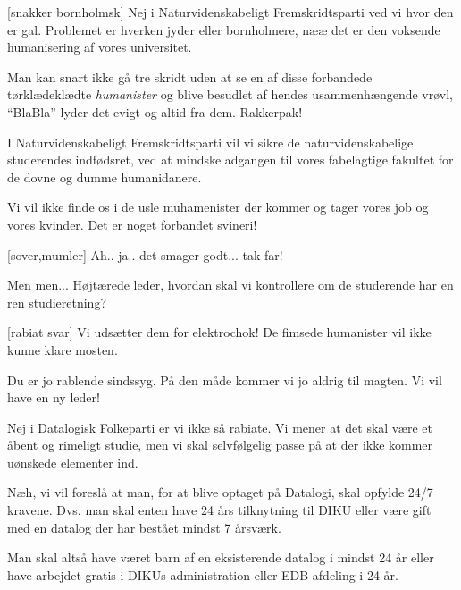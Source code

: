 \documentclass[a4paper,11pt]{article}
\begin{document}
\begin{sketch}
[snakker bornholmsk] Nej i Naturvidenskabeligt Fremskridtsparti ved vi hvor den er gal. Problemet er hverken jyder eller bornholmere, nææ det er den voksende humanisering af vores universitet. 

 Man kan snart ikke gå tre skridt uden at se en af disse forbandede tørklædeklædte \emph{humanister} og blive besudlet af hendes usammenhængende vrøvl, ``BlaBla'' lyder det evigt og altid fra dem. Rakkerpak!

 I Naturvidenskabeligt Fremskridtsparti vil vi sikre de naturvidenskabelige studerendes indfødsret, ved at mindske adgangen til vores fabelagtige fakultet for de dovne og dumme humanidanere. 

 Vi vil ikke finde os i de usle muhamenister der kommer og tager vores job og vores kvinder. Det er noget forbandet svineri!

[sover,mumler] Ah.. ja.. det smager godt... tak far!

 Men men... Højtærede leder, hvordan skal vi kontrollere om de studerende har en ren studieretning?

[rabiat svar] Vi udsætter dem for elektrochok! De fimsede humanister vil ikke kunne klare mosten.

 Du er jo rablende sindssyg. På den måde kommer vi jo aldrig til magten. Vi vil have en ny leder!




 Nej i Datalogisk Folkeparti er vi ikke så rabiate. Vi mener at det skal være et åbent og rimeligt studie, men vi skal selvfølgelig passe på at der ikke kommer uønskede elementer ind.

 Næh, vi vil foreslå at man, for at blive optaget på Datalogi, skal opfylde 24/7 kravene. Dvs. man skal enten have 24 års tilknytning til DIKU eller være gift med en datalog der har bestået mindst 7 årsværk.

 Man skal altså have været barn af en eksisterende datalog i mindst 24 år eller have arbejdet gratis i DIKUs administration eller EDB-afdeling i 24 år.


\end{sketch}
\end{document}
